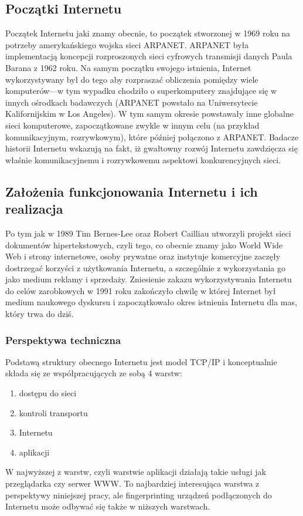 \subsection{Początki Internetu}
Początek Internetu jaki znamy obecnie, to początek stworzonej w 1969 roku na
potrzeby amerykańskiego wojska sieci ARPANET. ARPANET była implementacją
koncepcji rozproszonych sieci cyfrowych transmisji danych Paula Barana z 1962
roku. Na samym początku swojego istnienia, Internet wykorzystywany był do tego
aby rozpraszać obliczenia pomiędzy wiele komputerów---w tym wypadku chodziło o
superkomputery znajdujące się w innych ośrodkach badawczych (ARPANET powstało na
Uniwersytecie Kalifornijskim w Los Angeles). W tym samym okresie powstawały inne
globalne sieci komputerowe, zapoczątkowane zwykle w innym celu (na przykład
komunikacyjnym, rozrywkowym), które później połączono z ARPANET. Badacze
historii Internetu wskazują na fakt, iż gwałtowny rozwój Internetu zawdzięcza
się właśnie komunikacyjnemu i rozrywkowemu aspektowi konkurencyjnych sieci.

\subsection{Założenia funkcjonowania Internetu i ich realizacja}
Po tym jak w 1989 Tim Bernes-Lee oraz Robert Cailliau utworzyli projekt sieci
dokumentów hipertekstowych, czyli tego, co obecnie znamy jako World Wide Web i
strony internetowe, osoby prywatne oraz instytuje komercyjne zaczęły dostrzegać
korzyści z użytkowania Internetu, a szczególnie z wykorzystania go jako medium
reklamy i sprzedaży. Zniesienie zakazu wykorzystywania Internetu do celów
zarobkowych w 1991 roku zakończyło chwilę w której Internet był medium naukowego
dyskursu i zapoczątkowało okres istnienia Internetu dla mas, który trwa do dziś.

\subsubsection{Perspektywa techniczna}
Podstawą struktury obecnego Internetu jest model TCP/IP i konceptualnie składa
się ze współpracujących ze sobą 4 warstw:
\begin{enumerate}
	\item dostępu do sieci
	\item kontroli transportu
	\item Internetu
	\item aplikacji
\end{enumerate}
W najwyższej z warstw, czyli warstwie aplikacji działają takie usługi jak
przeglądarka czy serwer WWW. To najbardziej interesująca warstwa z perspektywy
niniejszej pracy, ale fingerprinting urządzeń podłączonych do Internetu może
odbywać się także w niższych warstwach. %

